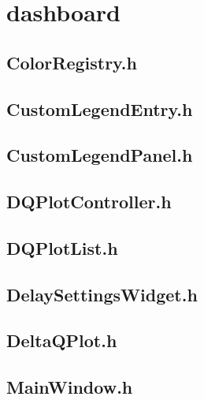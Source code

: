 \section{dashboard}

\subsection{ColorRegistry.h}


\subsection{CustomLegendEntry.h}


\subsection{CustomLegendPanel.h}


\subsection{DQPlotController.h}


\subsection{DQPlotList.h}


\subsection{DelaySettingsWidget.h}


\subsection{DeltaQPlot.h}


\subsection{MainWindow.h}



